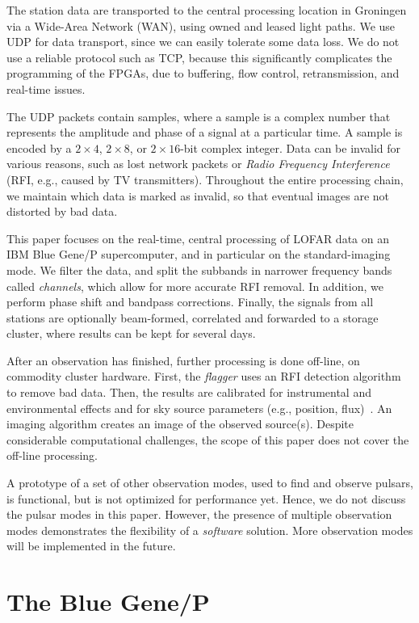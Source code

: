 \documentclass{sig-alternate}
\begin{document}
The station data are transported to the central processing location in
Groningen via a Wide-Area Network (WAN), using owned and leased light paths.
We use UDP for data transport, since we can easily tolerate some data loss.
We do not use a reliable protocol such as TCP, because this significantly
complicates the programming of the FPGAs, due to buffering, flow control,
retransmission, and real-time issues.

The UDP packets contain samples, where a sample is a complex number
that represents the amplitude and phase of a signal at a particular
time.  A sample is encoded by a $2\times4$, $2\times8$, or $2\times16$-bit
complex integer. Data can be invalid for various reasons, such as
lost network packets or \emph{Radio Frequency Interference\/} (RFI, e.g.,
caused by TV transmitters).
Throughout the entire processing chain, we maintain which
data is marked as invalid, so that eventual images are not distorted by
bad data.  

This paper focuses on the real-time, central processing of LOFAR data on
an IBM Blue Gene/P supercomputer, and in particular on the standard-imaging
mode.
We filter the data, and split the subbands in narrower frequency bands called
\emph{channels}, which allow for more accurate RFI removal.
In addition, we perform phase shift and bandpass corrections.
Finally, the signals from all stations are optionally beam-formed,
correlated and forwarded to a storage cluster, where results can be
kept for several days. 

After an observation has finished, further processing is done off-line, on
commodity cluster hardware. 
First, the \emph{flagger\/} uses an RFI detection algorithm to remove bad data.
Then, the results are calibrated for instrumental and environmental effects and
for sky source parameters (e.g., position, flux)~\cite{Nijboer:07}.
An imaging algorithm creates an image of the observed source(s).
Despite considerable computational challenges, the scope of this paper does not cover
the off-line processing.

A prototype of a set of other observation modes, used to find and observe
pulsars, is functional, but is not optimized for performance yet.
Hence, we do not discuss the pulsar modes in this paper.
However, the presence of multiple observation modes demonstrates the
flexibility of a \emph{software\/} solution.
More observation modes will be implemented in the future.


\section{The Blue Gene/P}
\label{sec:BG/P}
\end{document}
